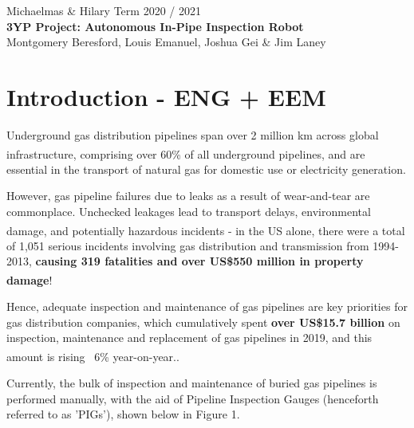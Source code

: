 \documentclass[11pt]{article}		%
\newcommand{\supercite}[1]{\textsuperscript{\cite{#1}}}		%
\begin{document}
	
	\flushleft
	\raggedright

	\begin{center}
		\vspace*{2cm}
		Michaelmas \& Hilary Term 2020 / 2021\\ %
		\vspace*{6cm}
		\huge{\textbf{3YP Project: Autonomous In-Pipe Inspection Robot}}\\ 
		\vspace*{6cm}
		\large{Montgomery Beresford, Louis Emanuel, Joshua Gei \& Jim Laney}
		\thispagestyle{empty} %
	\end{center}

	\newpage
	
	\pagestyle{empty}
	\tableofcontents
	
	\newpage
    \pagestyle{plain}
	\setcounter{page}{1}
	
	\section{Introduction - ENG + EEM}
	
		Underground gas distribution pipelines span over 2 million km across global infrastructure\supercite{pct2020states}, comprising over 60\% of all underground pipelines\supercite{pct2020states}, and are essential in the transport of natural gas for domestic use or electricity generation. 
		
		However, gas pipeline failures due to leaks as a result of wear-and-tear are commonplace. Unchecked leakages lead to transport delays, environmental damage, and potentially hazardous incidents\supercite{pct2020states} - in the US alone, there were a total of 1,051 serious incidents involving gas distribution and transmission from 1994-2013, \textbf{causing 319 fatalities and over US\$550 million in property damage}\supercite{pct2020states}!
		
		Hence, adequate inspection and maintenance of gas pipelines are key priorities for gas distribution companies, which cumulatively spent \textbf{over US\$15.7 billion} on inspection, maintenance  and replacement of gas pipelines in 2019, and this amount is rising ~6\% year-on-year.\supercite{pct2020states}. 
		
		Currently, the bulk of inspection and maintenance of buried gas pipelines is performed manually, with the aid of Pipeline Inspection Gauges (henceforth referred to as 'PIGs'), shown below in Figure 1. 
\end{document}
